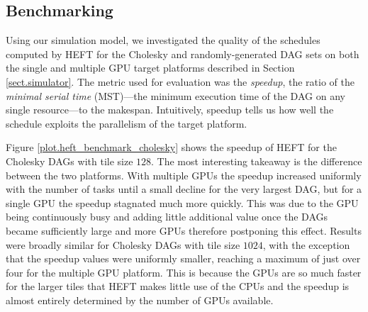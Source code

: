 \documentclass[runningheads]{llncs}
\begin{document}
\subsection{Benchmarking}
\label{subsect.benchmarking}

Using our simulation model, we investigated the quality of the schedules computed by HEFT for the Cholesky and randomly-generated DAG sets on both the single and multiple GPU target platforms described in Section \ref{sect.simulator}. The metric used for evaluation was the {\em speedup}, the ratio of the {\em minimal serial time} (MST)---the minimum execution time of the DAG on any single resource---to the makespan. Intuitively, speedup tells us how well the schedule exploits the parallelism of the target platform.

Figure \ref{plot.heft_benchmark_cholesky} shows the speedup of HEFT for the Cholesky DAGs with tile size $128$. The most interesting takeaway is the difference between the two platforms. With multiple GPUs the speedup increased uniformly with the number of tasks until a small decline for the very largest DAG, but for a single GPU the speedup stagnated much more quickly. This was due to the GPU being continuously busy and adding little additional value once the DAGs became sufficiently large and more GPUs therefore postponing this effect. Results were broadly similar for Cholesky DAGs with tile size $1024$, with the exception that the speedup values were uniformly smaller, reaching a maximum of just over four for the multiple GPU platform. This is because the GPUs are so much faster for the larger tiles that HEFT makes little use of the CPUs and the speedup is almost entirely determined by the number of GPUs available. 
\end{document}
